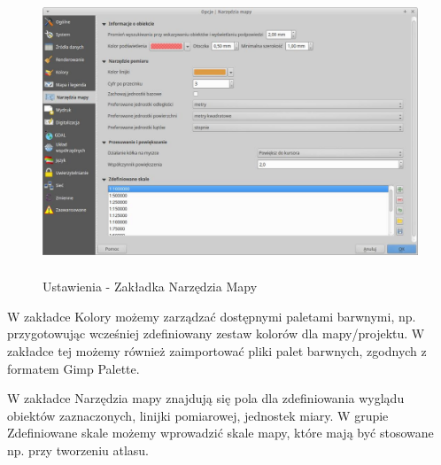 \documentclass[12pt,a4paper]{book}
\begin{document}
\begin{center}
\begin{figure}
\includegraphics[width=17cm,height=8.562cm]{002-zakladka-narzedzia.jpg}
\caption{Ustawienia - Zakładka Narzędzia Mapy}
\end{figure}
\end{center}
W zakładce Kolory możemy zarządzać dostępnymi paletami barwnymi, np. przygotowując wcześniej zdefiniowany zestaw kolorów dla mapy/projektu. W zakładce tej możemy również zaimportować pliki palet barwnych, zgodnych z formatem Gimp Palette.

W zakładce Narzędzia mapy znajdują się pola dla zdefiniowania wyglądu obiektów zaznaczonych, linijki pomiarowej, jednostek miary. W grupie Zdefiniowane skale możemy wprowadzić skale mapy, które mają być stosowane np. przy tworzeniu atlasu.
\end{document}
